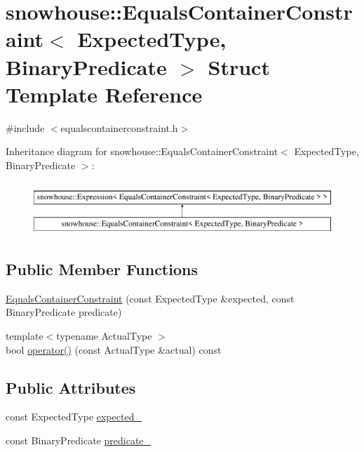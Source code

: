 \hypertarget{structsnowhouse_1_1EqualsContainerConstraint}{}\section{snowhouse\+::Equals\+Container\+Constraint$<$ Expected\+Type, Binary\+Predicate $>$ Struct Template Reference}
\label{structsnowhouse_1_1EqualsContainerConstraint}


{\ttfamily \#include $<$equalscontainerconstraint.\+h$>$}

Inheritance diagram for snowhouse\+::Equals\+Container\+Constraint$<$ Expected\+Type, Binary\+Predicate $>$\+:\begin{figure}[H]
\begin{center}
\leavevmode
\includegraphics[height=2.000000cm]{structsnowhouse_1_1EqualsContainerConstraint}
\end{center}
\end{figure}
\subsection*{Public Member Functions}
\begin{DoxyCompactItemize}
\item 
\mbox{\hyperlink{structsnowhouse_1_1EqualsContainerConstraint_a244529498595b21231278ebb31d88b86}{Equals\+Container\+Constraint}} (const Expected\+Type \&expected, const Binary\+Predicate predicate)
\item 
{\footnotesize template$<$typename Actual\+Type $>$ }\\bool \mbox{\hyperlink{structsnowhouse_1_1EqualsContainerConstraint_a9b932618783148d38db1e97ac973fb37}{operator()}} (const Actual\+Type \&actual) const
\end{DoxyCompactItemize}
\subsection*{Public Attributes}
\begin{DoxyCompactItemize}
\item 
const Expected\+Type \mbox{\hyperlink{structsnowhouse_1_1EqualsContainerConstraint_a454af9ec0fa5f256a93a85b8b4f34d80}{expected\+\_\+}}
\item 
const Binary\+Predicate \mbox{\hyperlink{structsnowhouse_1_1EqualsContainerConstraint_ab5db1081f06035e9d9641342649c14c1}{predicate\+\_\+}}
\end{DoxyCompactItemize}


